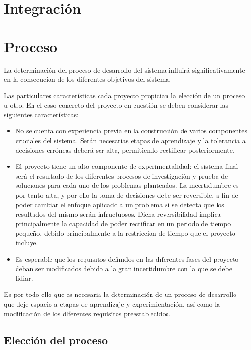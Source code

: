 \section{Integración}

\section{Proceso}

La determinación del proceso de desarrollo del sistema influirá significativamente en la consecución de los diferentes objetivos del sistema.

Las particulares características cada proyecto propician la elección de un proceso u otro. En el caso concreto del proyecto en cuestión se deben considerar las siguientes características:

\begin{itemize}

\item No se cuenta con experiencia previa en la construcción de varios componentes cruciales del sistema. Serán necesarias etapas de aprendizaje y la tolerancia a decisiones erróneas deberá ser alta, permitiendo rectificar posteriormente.

\item El proyecto tiene un alto componente de experimentalidad: el sistema final será el resultado de los diferentes procesos de investigación y prueba de soluciones para cada uno de los problemas planteados. La incertidumbre es por tanto alta, y por ello la toma de decisiones debe ser reversible, a fin de poder cambiar el enfoque aplicado a un problema si se detecta que los resultados del mismo serán infructuosos. Dicha reversibilidad implica principalmente la capacidad de poder rectificar en un periodo de tiempo pequeño, debido principalmente a la restricción de tiempo que el proyecto incluye.

\item Es esperable que los requisitos definidos en las diferentes fases del proyecto deban ser modificados debido a la gran incertidumbre con la que se debe lidiar.

\end{itemize}

Es por todo ello que es necesaria la determinación de un proceso de desarrollo que deje espacio a etapas de aprendizaje y experimientación, así como la modificación de los diferentes requisitos preestablecidos. 

\subsection{Elección del proceso}

